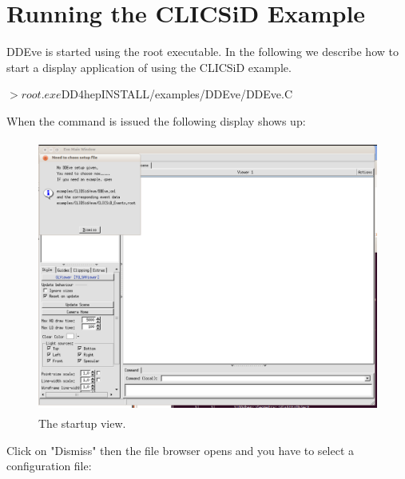 \documentclass[10pt,a4paper]{article}
\begin{document}
\section{Running the CLICSiD Example}
\label{sec:ddeve-user-manual-introduction}
\noindent
DDEve is started using the root executable. In the following we describe 
how to start a display application of \DDE using the CLICSiD example.
\begin{unnumberedcode}
$> root.exe $DD4hepINSTALL/examples/DDEve/DDEve.C 
\end{unnumberedcode}
When the command is issued the following display shows up:
\begin{figure}[h]
  \begin{center}
    \includegraphics[height=90mm] {DDEve_1}
    \caption{The \DDE startup view.}
    \label{fig:DDEve_1}
  \end{center}
\end{figure}
\newpage
\noindent
Click on "Dismiss" then the file browser opens and you have to select 
a \DDE configuration file:
\end{document}
